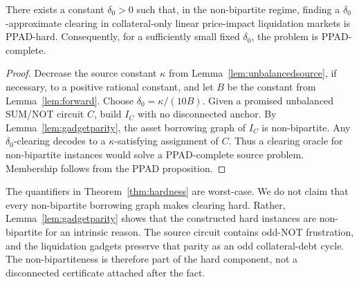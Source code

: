 \documentclass{llncs}
\begin{document}
\begin{theorem}
\label{thm:hardness}
There exists a constant \(\delta_0>0\) such that, in the non-bipartite regime, finding a \(\delta_0\)-approximate clearing in collateral-only linear price-impact liquidation markets is PPAD-hard. Consequently, for a sufficiently small fixed \(\delta_0\), the problem is PPAD-complete.
\end{theorem}
\begin{proof}
Decrease the source constant \(\kappa\) from Lemma~\ref{lem:unbalancedsource}, if necessary, to a positive rational constant, and let \(B\) be the constant from Lemma~\ref{lem:forward}. Choose \(\delta_0=\kappa/(10B)\). Given a promised unbalanced SUM/NOT circuit \(C\), build \(I_C\) with no disconnected anchor. By Lemma~\ref{lem:gadgetparity}, the asset borrowing graph of \(I_C\) is non-bipartite. Any \(\delta_0\)-clearing decodes to a \(\kappa\)-satisfying assignment of \(C\). Thus a clearing oracle for non-bipartite instances would solve a PPAD-complete source problem. Membership follows from the PPAD proposition.
\end{proof}

The quantifiers in Theorem~\ref{thm:hardness} are worst-case. We do not claim that every non-bipartite borrowing graph makes clearing hard. Rather, Lemma~\ref{lem:gadgetparity} shows that the constructed hard instances are non-bipartite for an intrinsic reason. The source circuit contains odd-NOT frustration, and the liquidation gadgets preserve that parity as an odd collateral-debt cycle. The non-bipartiteness is therefore part of the hard component, not a disconnected certificate attached after the fact.
\end{document}
